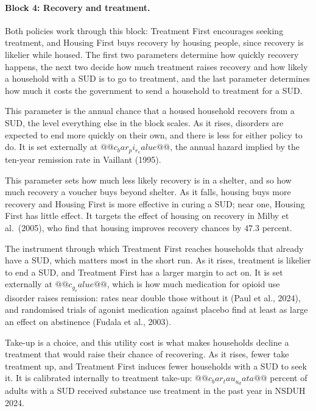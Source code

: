 \documentclass[10pt]{article}
\begin{document}
\paragraph{Block 4: Recovery and treatment.} Both policies work through this block: Treatment First encourages seeking treatment, and Housing First buys recovery by housing people, since recovery is likelier while housed.  The first two parameters determine how quickly recovery happens, the next two decide how much treatment raises recovery and how likely a household with a SUD is to go to treatment, and the last parameter determines how much it costs the government to send a household to treatment for a SUD.
\begin{description}\setlength{\itemsep}{0.25em}\setlength{\parskip}{0em}
\item[$\bar\pi_r$, the baseline SUD recovery rate.] This parameter is the annual chance that a housed household recovers from a SUD, the level everything else in the block scales. As it rises, disorders are expected to end more quickly on their own, and there is less for either policy to do. It is set externally at $@@c_bar_pi_r_value@@$, the annual hazard implied by the ten-year remission rate in Vaillant (1995). 
 \item[$\mu_H$, SUD recovery when homeless.] This parameter sets how much less likely recovery is in a shelter, and so how much recovery a voucher buys beyond shelter. As it falls, housing buys more recovery and Housing First is more effective in curing a SUD; near one, Housing First has little effect. It targets the effect of housing on recovery in Milby et al.\ (2005), who find that housing improves recovery chances by $47.3$ percent.
\item[$g$, the treatment effect on recovery.] The instrument through which Treatment First reaches households that already have a SUD, which matters most in the short run. As it rises, treatment is likelier to end a SUD, and Treatment First has a larger margin to act on. It is set externally at $@@c_g_value@@$, which is how much medication for opioid use disorder raises remission: rates near double those without it (Paul et al., 2024), and randomised trials of agonist medication against placebo find at least as large an effect on abstinence (Fudala et al., 2003).
\item[$\bar\tau^{u}$, the utility cost of treatment.] Take-up is a choice, and this utility cost is what makes households decline a treatment that would raise their chance of recovering. As it rises, fewer take treatment up, and Treatment First induces fewer households with a SUD to seek it. It is calibrated internally to treatment take-up: $@@c_bar_tau_u_data@@$ percent of adults with a SUD received substance use treatment in the past year in NSDUH 2024.

\end{description}
\end{document}
